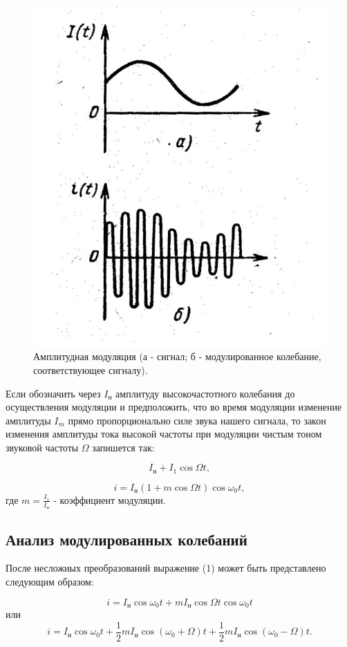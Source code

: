 \begin{figure}[h!]
	\centering
	\includegraphics[width=0.5\linewidth]{fig/fig1}
	\caption{Амплитудная модуляция (а - сигнал; б - модулированное колебание, соответствующее сигналу).}
	\label{fig:fig1}
\end{figure}

Если обозначить через $I_{\text{н}}$ амплитуду высокочастотного колебания до
осуществления модуляции и предположить, что во время модуляции изменение амплитуды $I_m$ прямо пропорционально силе звука нашего сигнала, то закон изменения амплитуды тока высокой частоты при модуляции чистым тоном
звуковой частоты $\Omega$ запишется так: 

$$I_{\text{н}}+I_1\cos{\Omega t},$$

\begin{equation}
	i = I_{\text{н}}(1+m\cos{\Omega t})\cos{\omega_0 t},
\end{equation}
где $m=\frac{I_1}{I_{\text{н}}}$ - коэффициент модуляции.

\subsection{Анализ модулированных колебаний}

После несложных преобразований выражение (1) может быть представлено следующим образом: 

\begin{equation}
	i = I_{\text{н}}\cos{\omega_0 t}+mI_{\text{н}}\cos{\Omega t}\cos{\omega_0 t}
\end{equation}
или
\begin{equation}
	i = I_{\text{н}}\cos{\omega_0 t}+\frac12mI_{\text{н}}\cos{(\omega_0+\Omega)t}+\frac12mI_{\text{н}}\cos{(\omega_0-\Omega)t}.
\end{equation}

